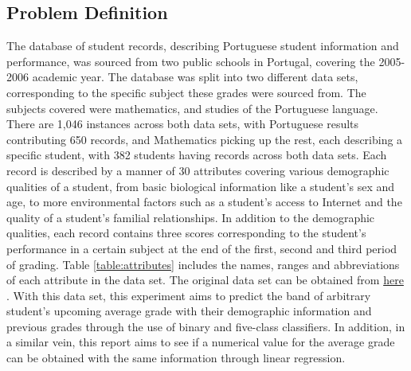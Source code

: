\subsection{Problem Definition}
The database of student records, describing Portuguese student information and performance, was sourced from two public schools in Portugal, covering the 2005-2006 academic year. The database was split into two different data sets, corresponding to the specific subject these grades were sourced from. The subjects covered were mathematics, and studies of the Portuguese language. There are 1,046 instances across both data sets, with Portuguese results contributing 650 records, and Mathematics picking up the rest, each describing a specific student, with 382 students having records across both data sets. Each record is described by a manner of 30 attributes covering various demographic qualities of a student, from basic biological information like a student's sex and age, to more environmental factors such as a student's access to Internet and the quality of a student's familial relationships. In addition to the demographic qualities, each record contains three scores corresponding to the student's performance in a certain subject at the end of the first, second and third period of grading. Table \ref{table:attributes} includes the names, ranges and abbreviations of each attribute in the data set. The original data set can be obtained from \href{https://archive.ics.uci.edu/ml/datasets/student+alcohol+consumption}{here} . With this data set, this experiment aims to predict the band of arbitrary student's upcoming average grade with their demographic information and previous grades through the use of binary and five-class classifiers. In addition, in a similar vein, this report aims to see if a numerical value for the average grade can be obtained with the same information through linear regression.


